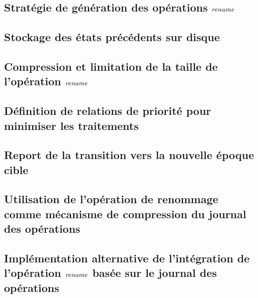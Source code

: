 
\subsection{Stratégie de génération des opérations $\mathit{rename}$}


\subsection{Stockage des états précédents sur disque}
\label{sec:offloading-former-states}


\subsection{Compression et limitation de la taille de l'opération $\mathit{rename}$}
\label{sec:compression-rename}


\subsection{Définition de relations de priorité pour minimiser les traitements}
\label{sec:alt-priority-relation}


\subsection{Report de la transition vers la nouvelle époque cible}
\label{sec:report-transition-to-target-epoch}


\subsection{Utilisation de l'opération de renommage comme mécanisme de compression du journal des opérations}
\label{sec:rename-as-compression-mechanism}


\subsection{Implémentation alternative de l'intégration de l'opération $\mathit{rename}$ basée sur le journal des opérations}
\label{sec:log-based-rename-mechanism}



